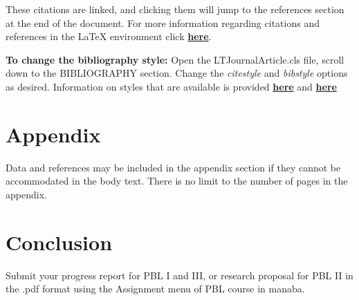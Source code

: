 \documentclass[
	a4paper, %
	10pt, %
]{LTJournalArticle}
\begin{document}
These citations are linked, and clicking them will jump to the references section at the end of the document. For more information regarding citations and references in the LaTeX environment click \href{https://www.overleaf.com/learn/latex/Bibliography_management_in_LaTeX}{\textbf{here}}.

\textbf{To change the bibliography style:} Open the LTJournalArticle.cls file, scroll down to the BIBLIOGRAPHY section. Change the \textit{citestyle} and \textit{bibstyle} options as desired. Information on styles that are available is provided \href{https://www.overleaf.com/learn/latex/Biblatex_bibliography_styles}{\textbf{here}} and \href{https://www.overleaf.com/learn/latex/Biblatex_citation_styles}{\textbf{here}}

\section{Appendix}
Data and references may be included in the appendix section if they cannot be accommodated in the body text. There is no limit to the number of pages in the appendix.

\section{Conclusion}
Submit your progress report for PBL I and III, or research proposal for PBL II in the .pdf format using the Assignment menu of PBL course in manaba.


\printbibliography %

\end{document}
